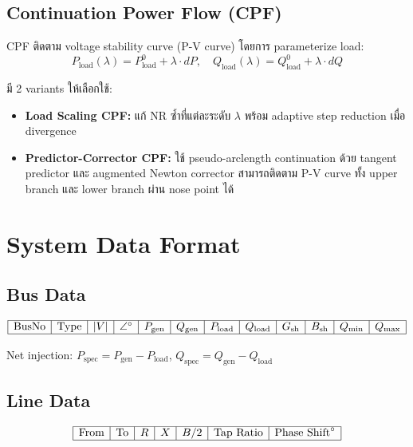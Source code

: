 \documentclass[12pt,a4paper]{article}
\begin{document}
\subsection{Continuation Power Flow (CPF)}

CPF ติดตาม voltage stability curve (P-V curve) โดยการ parameterize load:
\begin{equation}
P_{\text{load}}(\lambda) = P_{\text{load}}^0 + \lambda \cdot dP, \quad Q_{\text{load}}(\lambda) = Q_{\text{load}}^0 + \lambda \cdot dQ
\end{equation}

มี 2 variants ให้เลือกใช้:
\begin{itemize}
    \item \textbf{Load Scaling CPF:} แก้ NR ซ้ำที่แต่ละระดับ $\lambda$ พร้อม adaptive step reduction เมื่อ divergence
    \item \textbf{Predictor-Corrector CPF:} ใช้ pseudo-arclength continuation ด้วย tangent predictor และ augmented Newton corrector สามารถติดตาม P-V curve ทั้ง upper branch และ lower branch ผ่าน nose point ได้
\end{itemize}

\section{System Data Format}

\subsection{Bus Data}

\begin{equation}
\begin{array}{|c|c|c|c|c|c|c|c|c|c|c|c|}
\hline
\text{BusNo} & \text{Type} & |V| & \angle^{\circ} & P_{\text{gen}} & Q_{\text{gen}} & P_{\text{load}} & Q_{\text{load}} & G_{\text{sh}} & B_{\text{sh}} & Q_{\min} & Q_{\max} \\
\hline
\end{array}
\end{equation}

Net injection: $P_{\text{spec}} = P_{\text{gen}} - P_{\text{load}}$, $Q_{\text{spec}} = Q_{\text{gen}} - Q_{\text{load}}$

\subsection{Line Data}

\begin{equation}
\begin{array}{|c|c|c|c|c|c|c|}
\hline
\text{From} & \text{To} & R & X & B/2 & \text{Tap Ratio} & \text{Phase Shift}^{\circ} \\
\hline
\end{array}
\end{equation}
\end{document}
